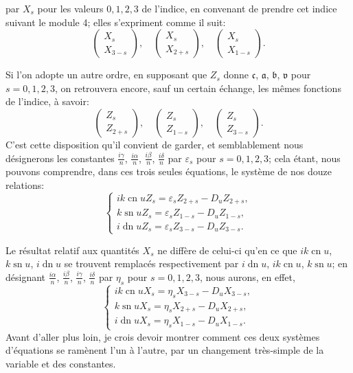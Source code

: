 \documentclass[11pt,leqno,oneside,letterpaper]{book}[2005/09/16]
\DeclareMathOperator{\sn}{sn}
\DeclareMathOperator{\cn}{cn}
\DeclareMathOperator{\dn}{dn}
\begin{document}
par $X_s$ pour les valeurs $0, 1, 2, 3$ de l'indice, en convenant de prendre cet
indice suivant le module 4; elles s'expriment comme il suit:
\[
\begin{pmatrix}
X_s \\ X_{3-s}
\end{pmatrix},
\quad
\begin{pmatrix}
X_s \\ X_{2+s}
\end{pmatrix},
\quad
\begin{pmatrix}
X_s \\ X_{1-s}
\end{pmatrix}.
\]

Si l'on adopte un autre ordre, en supposant que $Z_s$ donne $\mathfrak{c}$, $\mathfrak{a}$, $\mathfrak{b}$, $\mathfrak{v}$
pour $s = 0, 1, 2, 3$, on retrouvera encore, sauf un certain \'echange, les
m\^emes fonctions de l'indice, \`a savoir:
\[
\begin{pmatrix}
Z_s \\ Z_{2+s}
\end{pmatrix},
\quad
\begin{pmatrix}
Z_s \\ Z_{1-s}
\end{pmatrix},
\quad
\begin{pmatrix}
Z_s \\ Z_{3-s}
\end{pmatrix}.
\]
C'est cette disposition qu'il convient de garder, et semblablement nous d\'e\-signerons
les constantes $\frac{i\gamma}{n}$, $\frac{i\alpha}{n}$, $\frac{i\beta}{n}$, $\frac{i\delta}{n}$
par $\varepsilon_s$ pour $s = 0, 1, 2, 3$; cela \'etant,
nous pouvons comprendre, dans ces trois seules \'equations, le syst\`eme de
nos douze relations:
\[
\tag*{(I)}
\left\{
\begin{array}{r}
ik\cn u Z_s = \varepsilon_s Z_{2+s} - D_u Z_{2+s}, \\
 k\sn u Z_s = \varepsilon_s Z_{1-s} - D_u Z_{1-s}, \\
 i\dn u Z_s = \varepsilon_s Z_{3-s} - D_u Z_{3-s}.
\end{array}\right.
\]

Le r\'esultat relatif aux quantit\'es $X_s$ ne diff\`ere de celui-ci qu'en ce que
$ik\cn u$, $k\sn u$, $i\dn u$ se trouvent remplac\'es respectivement par $i\dn u$, $ik\cn u$,
$k\sn u$; en d\'esignant $\frac{i\alpha}{n}$, $\frac{i\beta}{n}$, $\frac{i\gamma}{n}$, $\frac{i\delta}{n}$ par
$\eta_s$ pour $s = 0, 1, 2, 3$, nous aurons, en effet,
\[
\tag*{(II)}
\left\{
\begin{array}{r}
ik\cn u X_s = \eta_s X_{3-s} - D_u X_{3-s}, \\
 k\sn u X_s = \eta_s X_{2+s} - D_u X_{2+s}, \\
 i\dn u X_s = \eta_s X_{1-s} - D_u X_{1-s}.
\end{array}\right.
\]
Avant d'aller plus loin, je crois devoir montrer comment ces deux syst\`emes
d'\'equations se ram\`enent l'un \`a l'autre, par un changement tr\`es-simple de
la variable et des constantes.
\end{document}
